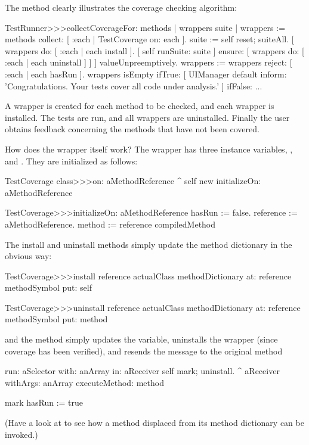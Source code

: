 \documentclass[a4paper,10pt,twoside]{book}
\begin{document}
The method  clearly illustrates the coverage checking algorithm:
\begin{code}{}
TestRunner>>>collectCoverageFor: methods
        | wrappers suite |
        wrappers := methods collect: [ :each | TestCoverage on: each ].
        suite := self
                reset;
                suiteAll.
        [ wrappers do: [ :each | each install ].
          [ self runSuite: suite ] ensure: [ wrappers do: [ :each | each uninstall ] ] ] valueUnpreemptively.
        wrappers := wrappers reject: [ :each | each hasRun ].
        wrappers isEmpty
                ifTrue:
                        [ UIManager default inform: 'Congratulations. Your tests cover all code under analysis.' ]
                ifFalse: ...
\end{code}
A wrapper is created for each method to be checked, and each wrapper is installed.
The tests are run, and all wrappers are uninstalled.
Finally the user obtains feedback concerning the methods that have not been covered.

How does the wrapper itself work?
The  wrapper has three instance variables, ,  and .
They are initialized as follows:
\begin{code}{}
TestCoverage class>>>on: aMethodReference
        ^ self new initializeOn: aMethodReference

TestCoverage>>>initializeOn: aMethodReference
        hasRun := false.
        reference := aMethodReference.
        method := reference compiledMethod
\end{code}

The install and uninstall methods simply update the method dictionary in the obvious way:
\begin{code}{}
TestCoverage>>>install
        reference actualClass methodDictionary
                at: reference methodSymbol
                put: self

TestCoverage>>>uninstall
        reference actualClass methodDictionary
                at: reference methodSymbol
                put: method
\end{code}
\noindent
and the  method simply updates the  variable, uninstalls the wrapper (since coverage has been verified), and resends the message to the original method
\begin{code}{}
run: aSelector with: anArray in: aReceiver
        self mark; uninstall.
        ^ aReceiver withArgs: anArray executeMethod: method

mark
        hasRun := true
\end{code}
(Have a look at  to see how a method displaced from its method dictionary can be invoked.)
\end{document}

